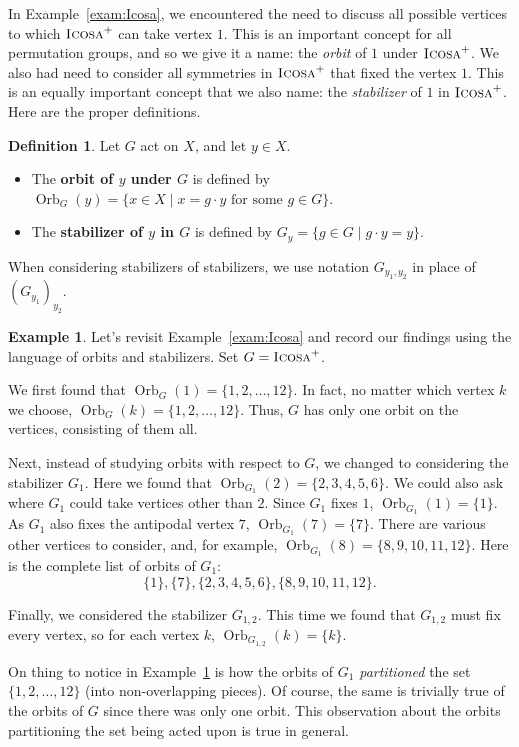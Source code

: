 \documentclass[11pt]{amsart}
\theoremstyle{plain}
\theoremstyle{definition}
\newtheorem{definition}[theorem]{Definition}
\newtheorem{example}{Example}
\theoremstyle{remark}
\newcommand{\rsymicosa}{\textsc{Icosa}^+}
\DeclareMathOperator{\Orb}{Orb}
\begin{document}
In Example~\ref{exam:Icosa}, we encountered the need to discuss all possible vertices to which $\rsymicosa$ can take vertex $1$. This is an important concept for all permutation groups, and so we give it a name: the \emph{orbit} of $1$ under $\rsymicosa$. We also had need to consider all symmetries in $\rsymicosa$ that fixed the  vertex $1$. This is an equally important concept that we also name:  the \emph{stabilizer} of $1$ in $\rsymicosa$. Here are the proper definitions.

\begin{definition}
Let $G$ act on $X$, and let $y\in X$. 
\begin{itemize}
\item The \textbf{orbit of $y$ under $G$} is defined by $\Orb_G(y) = \{ x\in X \mid \text{$x = g\cdot y$ for some $g\in G$}\}$.
\item The \textbf{stabilizer of $y$ in $G$} is defined by $G_y = \{ g\in G \mid g \cdot y = y\}$.
\end{itemize}
When considering stabilizers of stabilizers, we use notation $G_{y_1,y_2}$ in place of $(G_{y_1})_{y_2}$.
\end{definition}

\begin{example}\label{exam:IcosaOrbits}
Let's revisit Example~\ref{exam:Icosa} and record our findings using the language of orbits and stabilizers. Set $G = \rsymicosa$. 

We first found that $\Orb_G(1) = \{1,2,\dots, 12\}$. In fact, no matter which vertex $k$ we choose, $\Orb_G(k) = \{1,2,\dots, 12\}$. Thus, $G$ has only one orbit on the vertices, consisting of them all.

Next, instead of studying orbits with respect to $G$, we changed to considering the stabilizer $G_1$. Here we found that $\Orb_{G_1}(2) = \{2,3,4,5,6\}$. We could also ask where $G_1$ could take vertices other than $2$. Since $G_1$ fixes $1$, $\Orb_{G_1}(1) = \{1\}$. As $G_1$ also fixes the antipodal vertex $7$, $\Orb_{G_1}(7) = \{7\}$. There are various other vertices to consider, and, for example, $\Orb_{G_1}(8) = \{8,9,10,11,12\}$. Here is the complete list of orbits of $G_1$: \[\{1\}, \{7\}, \{2,3,4,5,6\}, \{8,9,10,11,12\}.\]

Finally, we considered the stabilizer $G_{1,2}$. This time we found that $G_{1,2}$ must fix every vertex, so for each vertex $k$, $\Orb_{G_{1,2}}(k) = \{k\}$.
\end{example}

On thing to notice in Example~\ref{exam:IcosaOrbits} is how the orbits of $G_1$ \emph{partitioned} the set $\{1,2,\dots, 12\}$ (into non-overlapping pieces). Of course, the same is trivially true of the orbits of $G$ since there was only one orbit. This observation about the orbits partitioning the set being acted upon is true in general.
\end{document}
